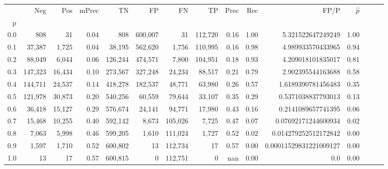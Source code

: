 \begin{tabular}{rrrrrrrrrrrrrrr}
\toprule
{} &      Neg &     Pos & mPrec &       TN &       FP &       FN &       TP &  Prec &   Rec &                    FP/P & $\hat{p}$ \\
p   &          &         &       &          &          &          &          &       &       &                         &           \\
\midrule
0.0 &      808 &      31 &  0.04 &      808 &  600,007 &       31 &  112,720 &  0.16 &  1.00 &       5.321522647249249 &      1.00 \\
0.1 &   37,387 &   1,725 &  0.04 &   38,195 &  562,620 &    1,756 &  110,995 &  0.16 &  0.98 &       4.989933570433965 &      0.94 \\
0.2 &   88,049 &   6,044 &  0.06 &  126,244 &  474,571 &    7,800 &  104,951 &  0.18 &  0.93 &       4.209018101835017 &      0.81 \\
0.3 &  147,323 &  16,434 &  0.10 &  273,567 &  327,248 &   24,234 &   88,517 &  0.21 &  0.79 &       2.902395544163688 &      0.58 \\
0.4 &  144,711 &  24,537 &  0.14 &  418,278 &  182,537 &   48,771 &   63,980 &  0.26 &  0.57 &      1.6189390781456483 &      0.35 \\
0.5 &  121,978 &  30,873 &  0.20 &  540,256 &   60,559 &   79,644 &   33,107 &  0.35 &  0.29 &      0.5371038837793013 &      0.13 \\
0.6 &   36,418 &  15,127 &  0.29 &  576,674 &   24,141 &   94,771 &   17,980 &  0.43 &  0.16 &      0.2141089657741395 &      0.06 \\
0.7 &   15,468 &  10,255 &  0.40 &  592,142 &    8,673 &  105,026 &    7,725 &  0.47 &  0.07 &     0.07692171244600934 &      0.02 \\
0.8 &    7,063 &   5,998 &  0.46 &  599,205 &    1,610 &  111,024 &    1,727 &  0.52 &  0.02 &    0.014279252512172842 &      0.00 \\
0.9 &    1,597 &   1,710 &  0.52 &  600,802 &       13 &  112,734 &       17 &  0.57 &  0.00 &  0.00011529831221009127 &      0.00 \\
1.0 &       13 &      17 &  0.57 &  600,815 &        0 &  112,751 &        0 &   nan &  0.00 &                     0.0 &      0.00 \\
\bottomrule
\end{tabular}
